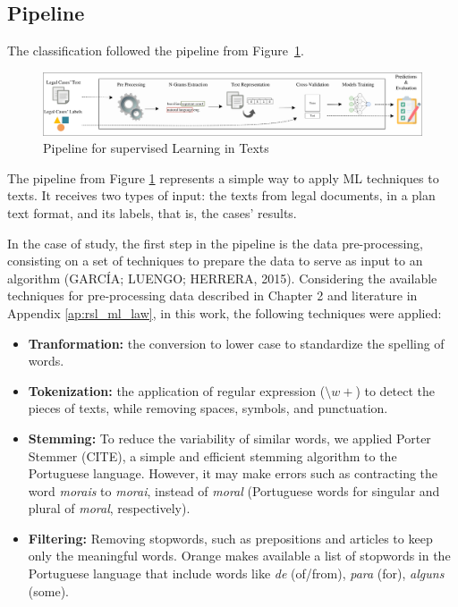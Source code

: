 


\subsection{Pipeline}

The classification followed the pipeline from Figure~\ref{fig:cap4_pipeline_superv_ml}.




\begin{figure}[htb]
    \centering
    \caption{Pipeline for supervised Learning in Texts}
    \label{fig:cap4_pipeline_superv_ml}
    \includegraphics[width=\textwidth]{images/chapters/cap4_classification_pipeline.pdf}
\end{figure}

The pipeline from Figure \ref{fig:cap4_pipeline_superv_ml} represents a simple way to apply ML techniques to texts. It receives two types of input: the texts from legal documents, in a plan text format, and its labels, that is, the cases' results.

In the case of study, the first step in the pipeline is the data pre-processing, consisting on a set of techniques to prepare the data to serve as input to an algorithm (GARCÍA; LUENGO; HERRERA, 2015). Considering the available techniques for pre-processing data described in Chapter 2 and literature in Appendix \ref{ap:rsl_ml_law}, in this work, the following techniques were applied:

\begin{itemize}[noitemsep]
    \item \textbf{Tranformation:} the conversion to lower case to standardize the spelling of words.
    \item \textbf{Tokenization:} the application of regular expression ($\setminus w+$) to detect the pieces of texts, while removing spaces, symbols, and punctuation.
    \item \textbf{Stemming:} To reduce the variability of similar words, we applied Porter Stemmer (CITE), a simple and efficient stemming algorithm to the Portuguese language. However, it may make errors such as contracting the word \textit{morais} to \textit{morai}, instead of \textit{moral} (Portuguese words for singular and plural of \textit{moral}, respectively).
    \item \textbf{Filtering:} Removing stopwords, such as prepositions and articles to keep only the meaningful words. Orange makes available a list of stopwords in the Portuguese language that include words like \textit{de} (of/from), \textit{para} (for), \textit{alguns} (some).
\end{itemize}



